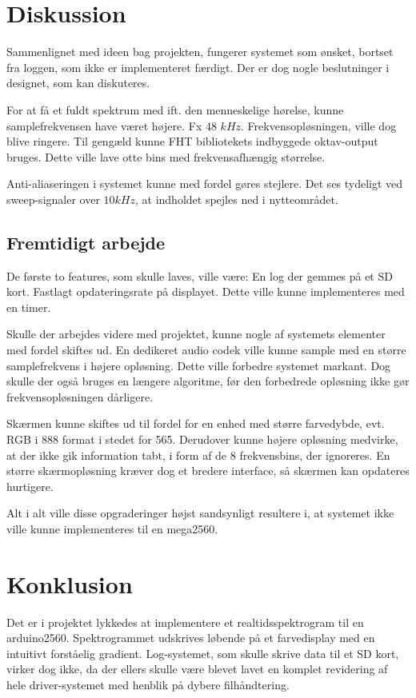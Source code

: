 \section{Diskussion}
Sammenlignet med ideen bag projekten, fungerer systemet som ønsket, bortset fra loggen, som ikke er implementeret færdigt. 
Der er dog nogle beslutninger i designet, som kan diskuteres. 

For at få et fuldt spektrum med ift. den menneskelige hørelse, kunne samplefrekvensen have været højere. 
Fx 48 $kHz$. 
Frekvensopløsningen, ville dog blive ringere. Til gengæld kunne FHT bibliotekets indbyggede oktav-output bruges. Dette ville lave otte bins med frekvensafhængig størrelse.

Anti-aliaseringen i systemet kunne med fordel gøres stejlere. Det ses tydeligt ved sweep-signaler over $10 kHz$, at indholdet spejles ned i nytteområdet.

\subsection{Fremtidigt arbejde}
De første to features, som skulle laves, ville være:
En log der gemmes på et SD kort.
Fastlagt opdateringsrate på displayet. Dette ville kunne implementeres med en timer. 

Skulle der arbejdes videre med projektet, kunne nogle af systemets elementer med fordel skiftes ud. 
En dedikeret audio codek ville kunne sample med en større samplefrekvens i højere opløsning. 
Dette ville forbedre systemet markant. 
Dog skulle der også bruges en længere algoritme, før den forbedrede opløsning ikke gør frekvensopløsningen dårligere.

Skærmen kunne skiftes ud til fordel for en enhed med større farvedybde, evt. RGB i 888 format i stedet for 565. 
Derudover kunne højere opløsning medvirke, at der ikke gik information tabt, i form af de 8 frekvensbins, der ignoreres. 
En større skærmopløsning kræver dog et bredere interface, så skærmen kan opdateres hurtigere. 

Alt i alt ville disse opgraderinger højst sandsynligt resultere i, at systemet ikke ville kunne implementeres til en mega2560.

\section{Konklusion}
Det er i projektet lykkedes at implementere et realtidsspektrogram til en arduino2560. 
Spektrogrammet udskrives løbende på et farvedisplay med en intuitivt forståelig gradient.  
Log-systemet, som skulle skrive data til et SD kort, virker dog ikke, da der ellers skulle være blevet lavet en komplet revidering af hele driver-systemet med henblik på dybere filhåndtering. 

